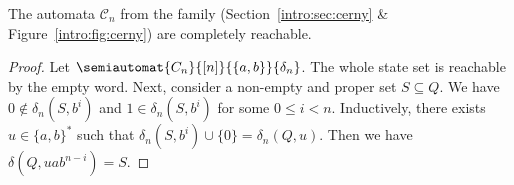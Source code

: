 \begin{theorem}
	\label{sync_max:thm:cerny_compl_reach}
	The automata $\mathcal C_n$ from the \Cerny family (Section~\ref{intro:sec:cerny} \& Figure~\ref{intro:fig:cerny})
	are completely reachable.
\end{theorem}
\begin{proof}
	Let $\semiautomat{C_n}{[n]}{\{a,b\}}{\delta_n}$.
	The whole state set is reachable by the empty word.
	Next, consider a non-empty and proper set $S \subseteq Q$.
	We have $0 \notin \delta_n(S, b^i)$ and $1 \in \delta_n(S, b^i)$
	for some $0 \le i < n$.
	Inductively, there exists $u \in \{a,b\}^*$ such that
	$\delta_n(S, b^i) \cup \{0\} = \delta_n(Q, u)$.
	Then we have $\delta(Q, uab^{n - i}) = S$.
%	
\end{proof}
